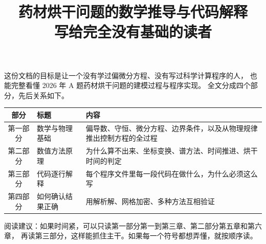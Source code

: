 \documentclass[12pt,a4paper]{article}
\title{\bfseries 药材烘干问题的数学推导与代码解释\\[4pt]
\large 写给完全没有基础的读者}
\author{}
\date{}
\begin{document}
\maketitle
\thispagestyle{empty}

\vspace{1em}
\noindent
这份文档的目标是让一个没有学过偏微分方程、没有写过科学计算程序的人，
也能完整看懂 2026 年 A 题药材烘干问题的建模过程与程序实现。
全文分成四个部分，先后关系如下。

\begin{center}
\begin{tabular}{@{}clp{8.6cm}@{}}
\toprule
部分 & 标题 & 内容 \\
\midrule
第一部分 & 数学与物理基础 & 偏导数、守恒、微分方程、边界条件，以及从物理规律推出控制方程的全过程 \\
第二部分 & 数值方法原理 & 为什么算不出来、坐标变换、谱方法、时间推进、烘干时间的判定 \\
第三部分 & 代码逐行解释 & 每个程序文件里每一段代码在做什么，为什么必须这么写 \\
第四部分 & 如何确认结果正确 & 用解析解、网格加密、多种方法互相验证 \\
\bottomrule
\end{tabular}
\end{center}

\noindent
阅读建议：如果时间紧，可以只读第一部分第一到第三章、第二部分第五章和第六章，
再读第三部分，这样能抓住主干。如果每一个符号都想弄懂，就按顺序读。

\newpage
\tableofcontents
\newpage





\end{document}
